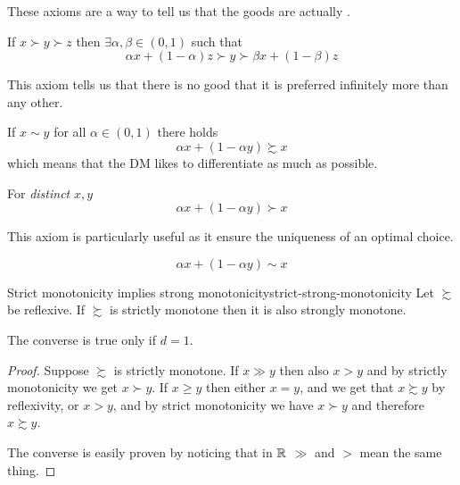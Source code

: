 \documentclass[12pt]{extarticle}
\begin{document}
\begin{description}
          These axioms are a way to tell us that the goods are actually .

    \item[Archimedean] If $x \succ y \succ z$ then $\exists \alpha, \beta \in (0, 1)$ such that
          \begin{equation}
              \alpha x + (1- \alpha)z \succ y \succ \beta x + (1-\beta) z
          \end{equation}

          This axiom tells us that there is no good that it is preferred infinitely more than any other.

    \item[Convexity] If $x \sim y$ for all $\alpha \in (0, 1)$ there holds
          \begin{equation}
              \alpha x + (1-\alpha y) \succsim x
          \end{equation}
          which means that the DM likes to differentiate as much as possible.

          \begin{description}[font=\normalfont\itshape\space]
              \item[Strict convexity] For \emph{distinct} $x, y$
                    \begin{equation}
                        \alpha x + (1-\alpha y) \succ x
                    \end{equation}

                    This axiom is particularly useful as it ensure the uniqueness of an optimal choice.
              \item[Affinity]
                    \begin{equation}
                        \alpha x + (1-\alpha y) \sim x
                    \end{equation}

          \end{description}
\end{description}

\begin{lemma}{Strict monotonicity implies strong monotonicity}{strict-strong-monotonicity}
    Let $\succsim$ be reflexive.
    If $\succsim$ is strictly monotone then it is also strongly monotone.

    The converse is true only if $d = 1$.
\end{lemma}

\begin{proof}
    Suppose $\succsim$ is strictly monotone.
    If $x\gg y$ then also $x \gt y$ and by strictly monotonicity we get $x \succ y$.
    If $x\geq y$ then either $x = y$, and we get that $x \succsim y$ by reflexivity,
    or $x > y$, and by strict monotonicity we have $x\succ y$ and therefore $x \succsim y$.

    The converse is easily proven by noticing that in $\mathbb{R}$ $\gg$ and $\gt$ mean the same thing.
\end{proof}
\end{document}
